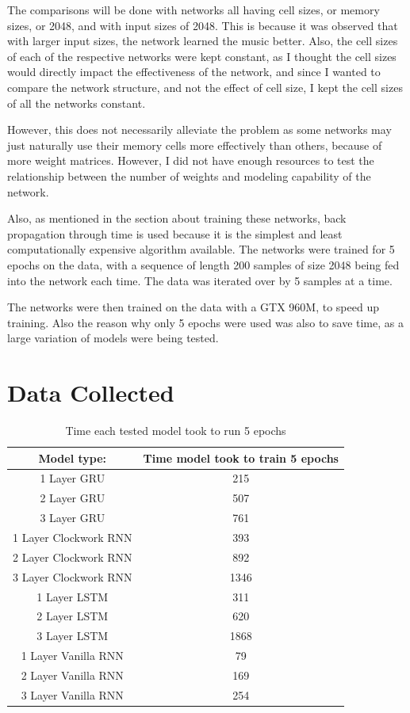 \documentclass{article}
\begin{document}
The comparisons will be done with networks all having cell sizes, or memory
sizes, or 2048, and with input sizes of 2048. This is because it was observed
that with larger input sizes, the network learned the music better. Also, the
cell sizes of each of the respective networks were kept constant, as I thought
the cell sizes would directly impact the effectiveness of the network, and since
I wanted to compare the network structure, and not the effect of cell size, I
kept the cell sizes of all the networks constant.

However, this does not necessarily alleviate the problem as some networks may
just naturally use their memory cells more effectively than others, because of
more weight matrices. However, I did not have enough resources to test the
relationship between the number of weights and modeling capability of the
network.

Also, as mentioned in the section about training these networks, back
propagation through time is used because it is the simplest and least
computationally expensive algorithm available. The networks were trained for 5
epochs on the data, with a sequence of length 200 samples of size 2048 being fed
into the network each time. The data was iterated over by 5 samples at a time.

The networks were then trained on the data with a GTX 960M, to speed up
training. Also the reason why only 5 epochs were used was also to save time, as
a large variation of models were being tested.

\section{Data Collected}
\begin{table}[H]
	\begin{tabular}{c|c}
		Model type: & Time model took to train 5 epochs \\\hline
		1 Layer GRU& 215 \\
		2 Layer GRU& 507\\
		3 Layer GRU& 761\\
		1 Layer Clockwork RNN& 393\\
		2 Layer Clockwork RNN& 892\\
		3 Layer Clockwork RNN& 1346\\
		1 Layer LSTM& 311\\
		2 Layer LSTM& 620\\
		3 Layer LSTM& 1868\\
		1 Layer Vanilla RNN& 79\\
		2 Layer Vanilla RNN& 169\\
		3 Layer Vanilla RNN& 254\\
	\end{tabular}
	\caption{Time each tested model took to run 5 epochs}
\end{table}
\end{document}
